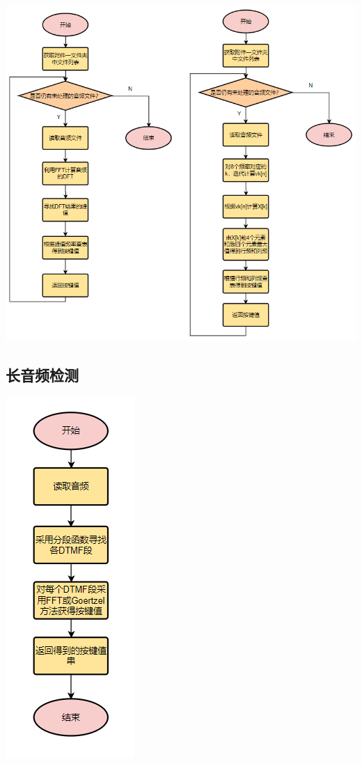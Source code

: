 \documentclass[10pt, a4paper]{article}
\begin{document}
\centerline{\includegraphics[scale=0.8]{assets/7.png}}

\subsection{长音频检测}
\centerline{\includegraphics[scale=0.8]{assets/6.png}}
\end{document}

